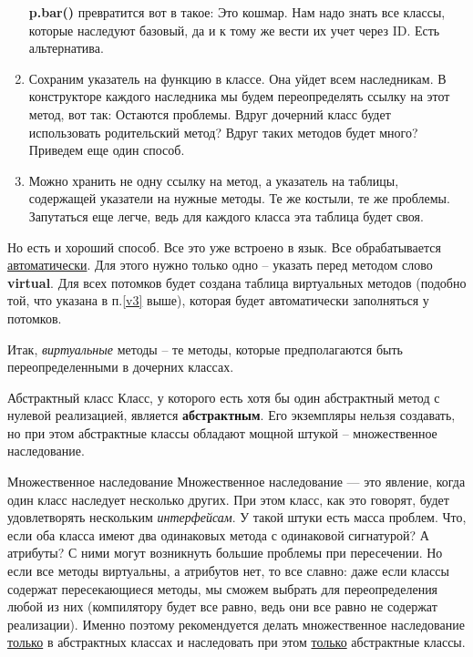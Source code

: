 \begin{lecture}[\lectureSubject]
\begin{lecSection}
\begin{lecSection}
\begin{enumerate}
				\textbf{p.bar()} превратится вот в такое:
				Это кошмар. Нам надо знать все классы, которые наследуют базовый, да и к тому же вести их учет через ID. Есть альтернатива.
				\item Сохраним указатель на функцию в классе. Она уйдет всем наследникам. В конструкторе каждого наследника мы будем переопределять ссылку на этот метод, вот так:
				Остаются проблемы. Вдруг дочерний класс будет использовать родительский метод? Вдруг таких методов будет много? Приведем еще один способ.
				
				\item \label{v3} Можно хранить не одну ссылку на метод, а указатель на таблицы, содержащей указатели на нужные методы. Те же костыли, те же проблемы. Запутаться еще легче, ведь для каждого класса эта таблица будет своя.
			\end{enumerate}
			
			Но есть и  хороший способ. Все это уже встроено в язык. Все обрабатывается \underline{автоматически}. Для этого нужно только одно -- указать перед методом слово \textbf{virtual}. Для всех потомков будет создана таблица виртуальных методов (подобно той, что указана в п.\ref{v3} выше), которая будет автоматически заполняться у потомков.
			
			Итак, \textit{виртуальные} методы -- те методы, которые предполагаются быть переопределенными в дочерних классах.
		\end{lecSection}
		
		\begin{lecSection}
			\begin{lecSubsection}{Абстрактный класс}
				Класс, у которого есть хотя бы один абстрактный метод с нулевой реализацией, является \textbf{абстрактным}. Его экземпляры нельзя создавать, но при этом абстрактные классы обладают мощной штукой -- множественное наследование.
			\end{lecSubsection}
			\begin{lecSubsection}{Множественное наследование}
				Множественное наследование --- это явление, когда один класс наследует несколько других. При этом класс, как это говорят, будет удовлетворять нескольким \textit{интерфейсам}. У такой штуки есть масса проблем. Что, если оба класса имеют два одинаковых метода с одинаковой сигнатурой? А атрибуты? С ними могут возникнуть большие проблемы при пересечении. Но если все методы виртуальны, а атрибутов нет, то все славно: даже если классы содержат пересекающиеся методы, мы сможем выбрать для переопределения любой из них (компилятору будет все равно, ведь они все равно не содержат реализации). Именно поэтому рекомендуется делать множественное наследование \underline{только} в абстрактных классах и наследовать при этом \underline{только} абстрактные классы.
			\end{lecSubsection}
			

\end{lecSection}
\end{lecSection}
\end{lecture}
